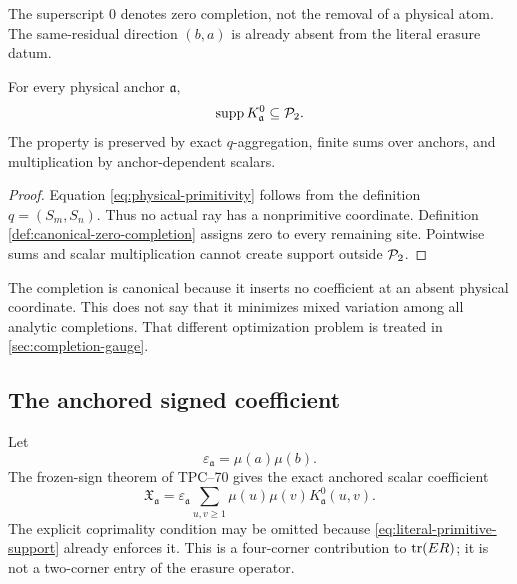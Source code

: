 The superscript \(0\) denotes zero completion, not the removal of a
physical atom.  The same-residual direction \((b,a)\) is already absent
from the literal erasure datum.

\begin{theorem}
\label{thm:literal-primitive-support}
For every physical anchor \(\mathfrak a\),
\begin{equation}
 \operatorname{supp} K_{\mathfrak a}^{0}\subseteq\mathcal P_2.
 \label{eq:literal-primitive-support}
\end{equation}
The property is preserved by exact \(q\)-aggregation, finite sums over
anchors, and multiplication by anchor-dependent scalars.
\end{theorem}

\begin{proof}
Equation \eqref{eq:physical-primitivity} follows from the definition
\(q=(S_m,S_n)\).  Thus no actual ray has a nonprimitive coordinate.
Definition \ref{def:canonical-zero-completion} assigns zero to every
remaining site.  Pointwise sums and scalar multiplication cannot create
support outside \(\mathcal P_2\).
\end{proof}

\begin{remark}
\label{rem:not-variation-minimal}
The completion is canonical because it inserts no coefficient at an
absent physical coordinate.  This does not say that it minimizes mixed
variation among all analytic completions.  That different optimization
problem is treated in \cref{sec:completion-gauge}.
\end{remark}

\subsection{The anchored signed coefficient}

Let
\[
 \varepsilon_{\mathfrak a}=\mu(a)\mu(b).
\]
The frozen-sign theorem of TPC--70 \citep{WangTPC70} gives the exact
anchored scalar
coefficient
\begin{equation}
 \boxed{
 \mathfrak X_{\mathfrak a}
 =
 \varepsilon_{\mathfrak a}
 \sum_{u,v\ge1}
 \mu(u)\mu(v)K_{\mathfrak a}^{0}(u,v).}
 \label{eq:anchored-physical-sum}
\end{equation}
The explicit coprimality condition may be omitted because
\eqref{eq:literal-primitive-support} already enforces it.  This is a
four-corner contribution to \(\operatorname{tr}(ER)\); it is not a two-corner entry of
the erasure operator.
